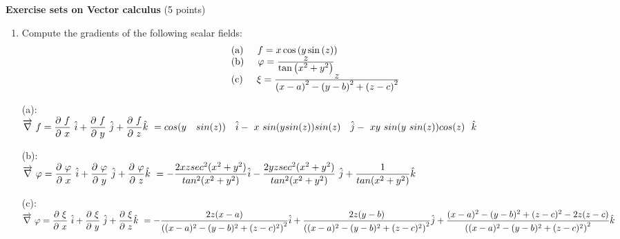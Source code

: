 \documentclass[fleqn]{article}
\begin{document}
  \textbf{Exercise sets on Vector calculus} (5 points)
  \begin{enumerate}
    \item Compute the gradients of the following scalar fields: \\
      \[
      \begin{array}{lll}
      & {\rm (a)\hspace{0.2in}} f=x\cos \left( y\sin \left( z\right) \right)  \\
      
      & {\rm (b)\hspace{0.2in} }\varphi =\frac{\textstyle z}{\textstyle\tan \left( x^{2}+y^{2}\right) } \\
      
      & {\rm
      (c)\hspace{0.2in}}\xi =\frac{\textstyle z}{\textstyle \left( x-a\right) ^{2}-\left( y-b\right) ^{2}+\left(z-c\right) ^{2}}
      \end{array}
      \]

      \textcolor{hwColor}{
        (a): \\ 
        $
          \overrightarrow{\nabla} f=\dfrac{\partial f}{\partial x} \hat{i}+\dfrac{\partial f}{\partial y} \hat{j}+\dfrac{\partial f}{\partial z}\hat{k} \\ 
          =cos(y ~ sin(z)) ~ \hat{i}- x sin(ysin(z))sin(z) ~ \hat{j}- xy sin(y sin(z))cos(z)~ \hat{k}
        $
      }

      \textcolor{hwColor}{
        (b): \\
        $
          \overrightarrow{\nabla} \varphi=\dfrac{\partial \varphi}{\partial x} \hat{i}+\dfrac{\partial \varphi}{\partial y} \hat{j}+\dfrac{\partial \varphi}{\partial z}\hat{k} \\ 
          =-\dfrac{2xz sec^2(x^2+y^2)}{tan^2(x^2+y^2)} \hat{i}
          -\dfrac{2yz sec^2(x^2+y^2)}{tan^2(x^2+y^2)} \hat{j}
          +\dfrac{1}{tan(x^2+y^2)}\hat{k}
        $
      }

      \textcolor{hwColor}{
        (c): \\ 
        $
          \overrightarrow{\nabla} \varphi=\dfrac{\partial \xi}{\partial x} \hat{i}+\dfrac{\partial \xi}{\partial y} \hat{j}+\dfrac{\partial \xi}{\partial z}\hat{k} \\ 
          =-\dfrac{2z(x-a)}{\left((x-a)^2-(y-b)^2+(z-c)^2\right)^2} \hat{i} \\ \\   
          +\dfrac{2z(y-b)}{\left((x-a)^2-(y-b)^2+(z-c)^2\right)^2} \hat{j} \\ \\
          +\dfrac{(x-a)^2-(y-b)^2+(z-c)^2-2z(z-c)}{\left((x-a)^2-(y-b)^2+(z-c)^2\right)^2} \hat{k}
        $
      }
   

\end{enumerate}
\end{document}
